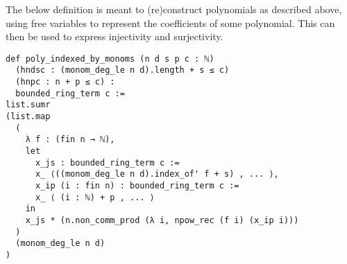 The below definition is meant to (re)construct polynomials as described above,
using free variables to represent the coefficients of some polynomial.
This can then be used to express injectivity and surjectivity.

\begin{lstlisting}
def poly_indexed_by_monoms (n d s p c : ℕ)
  (hndsc : (monom_deg_le n d).length + s ≤ c)
  (hnpc : n + p ≤ c) :
  bounded_ring_term c :=
list.sumr
(list.map
  (
    λ f : (fin n → ℕ),
    let
      x_js : bounded_ring_term c :=
      x_ ⟨((monom_deg_le n d).index_of' f + s) , ... ⟩,
      x_ip (i : fin n) : bounded_ring_term c :=
      x_ ⟨ (i : ℕ) + p , ... ⟩
    in
    x_js * (n.non_comm_prod (λ i, npow_rec (f i) (x_ip i)))
  )
  (monom_deg_le n d)
) \end{lstlisting}

